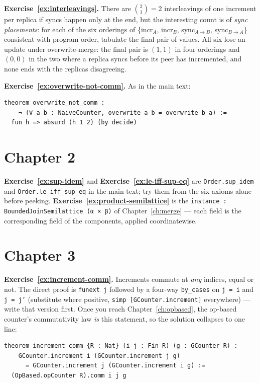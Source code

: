 \documentclass[12pt, a4paper, openright]{book}
\theoremstyle{thmstyle}
\theoremstyle{defstyle}
\newcommand{\lc}[1]{\texttt{#1}}
\begin{document}
\textbf{Exercise~\ref{ex:interleavings}.} There are $\binom{2}{1}=2$
interleavings of one increment per replica if syncs happen only at the
end, but the interesting count is of \emph{sync placements}: for each of
the six orderings of \{incr$_A$, incr$_B$, sync$_{A\to B}$,
sync$_{B\to A}$\} consistent with program order, tabulate the final
pair of values. All six lose an update under overwrite-merge: the final
pair is $(1, 1)$ in four orderings and $(0, 0)$ in the two where a
replica syncs before its peer has incremented, and none ends with the
replicas disagreeing.

\textbf{Exercise~\ref{ex:overwrite-not-comm}.} As in the main text:

\begin{verbatim}
theorem overwrite_not_comm :
    ¬ (∀ a b : NaiveCounter, overwrite a b = overwrite b a) :=
  fun h => absurd (h 1 2) (by decide)
\end{verbatim}

\section*{Chapter 2}

\textbf{Exercise~\ref{ex:sup-idem}} and
\textbf{Exercise~\ref{ex:le-iff-sup-eq}} are \lc{Order.sup_idem} and
\lc{Order.le_iff_sup_eq} in the main text; try them from the six axioms
alone before peeking. \textbf{Exercise~\ref{ex:product-semilattice}} is
the \lc{instance : BoundedJoinSemilattice (α × β)} of
Chapter~\ref{ch:merge} --- each field is the corresponding field of the
components, applied coordinatewise.

\section*{Chapter 3}

\textbf{Exercise~\ref{ex:increment-comm}.} Increments commute at
\emph{any} indices, equal or not. The direct proof is \lc{funext j}
followed by a four-way \lc{by_cases} on \lc{j = i} and \lc{j = j'}
(substitute where positive, \lc{simp [GCounter.increment]} everywhere)
--- write that version first. Once you reach
Chapter~\ref{ch:opbased}, the op-based counter's commutativity law
\emph{is} this statement, so the solution collapses to one line:

\begin{verbatim}
theorem increment_comm {R : Nat} (i j : Fin R) (g : GCounter R) :
    GCounter.increment i (GCounter.increment j g)
      = GCounter.increment j (GCounter.increment i g) :=
  (OpBased.opCounter R).comm i j g
\end{verbatim}
\end{document}

